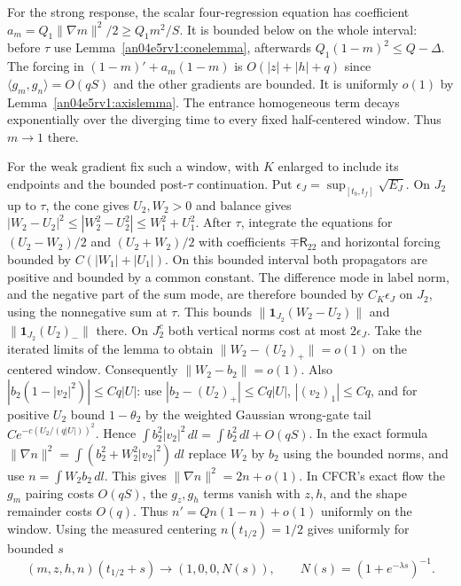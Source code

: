 \documentclass[11pt]{article}
\newcommand{\dd}{\,dl}
\begin{document}
For the strong response, the scalar four-regression equation has coefficient $a_m=Q_1\|\nabla m\|^2/2\ge Q_1m^2/S$. It is bounded below on the whole interval: before $\tau$ use Lemma~\ref{an04e5rv1:conelemma}, afterwards $Q_1(1-m)^2\le Q-\Delta$. The forcing in $(1-m)'+a_m(1-m)$ is $O(|z|+|h|+q)$ since $\langle g_m,g_n\rangle=O(qS)$ and the other gradients are bounded. It is uniformly $o(1)$ by Lemma~\ref{an04e5rv1:axislemma}. The entrance homogeneous term decays exponentially over the diverging time to every fixed half-centered window. Thus $m\to1$ there.

For the weak gradient fix such a window, with $K$ enlarged to include its endpoints and the bounded post-$\tau$ continuation. Put $\epsilon_J=\sup_{[t_b,t_f]}\sqrt{E_J}$. On $J_2$ up to $\tau$, the cone gives $U_2,W_2>0$ and balance gives
$|W_2-U_2|^2\le |W_2^2-U_2^2|\le W_1^2+U_1^2$.
After $\tau$, integrate the equations for $(U_2-W_2)/2$ and $(U_2+W_2)/2$ with coefficients $\mp\mathsf R_{22}$ and horizontal forcing bounded by $C(|W_1|+|U_1|)$. On this bounded interval both propagators are positive and bounded by a common constant. The difference mode in label norm, and the negative part of the sum mode, are therefore bounded by $C_K\epsilon_J$ on $J_2$, using the nonnegative sum at $\tau$. This bounds $\|\mathbf1_{J_2}(W_2-U_2)\|$ and $\|\mathbf1_{J_2}(U_2)_-\|$ there. On $J_2^c$ both vertical norms cost at most $2\epsilon_J$. Take the iterated limits of the lemma to obtain $\|W_2-(U_2)_+\|=o(1)$ on the centered window. Consequently $\|W_2-b_2\|=o(1)$. Also $|b_2(1-|v_2|^2)|\le Cq|U|$: use $|b_2-(U_2)_+|\le Cq|U|$, $|(v_2)_1|\le Cq$, and for positive $U_2$ bound $1-\theta_2$ by the weighted Gaussian wrong-gate tail $Ce^{-c(U_2/(q|U|))^2}$. Hence
$\int b_2^2|v_2|^2\dd=\int b_2^2\dd+O(qS)$. In the exact formula
$\|\nabla n\|^2=\int(b_2^2+W_2^2|v_2|^2)\dd$ replace $W_2$ by $b_2$ using the bounded norms, and use $n=\int W_2 b_2\dd$. This gives $\|\nabla n\|^2=2n+o(1)$. In CFCR's exact flow the $g_m$ pairing costs $O(qS)$, the $g_z,g_h$ terms vanish with $z,h$, and the shape remainder costs $O(q)$. Thus $n'=Q n(1-n)+o(1)$ uniformly on the window. Using the measured centering $n(t_{1/2})=1/2$ gives uniformly for bounded $s$
\begin{equation}\label{an04e5rv1:logistic}
 (m,z,h,n)(t_{1/2}+s)\longrightarrow(1,0,0,N(s)),\qquad
 N(s)=(1+e^{-\lambda s})^{-1}.
\end{equation}
\end{document}
